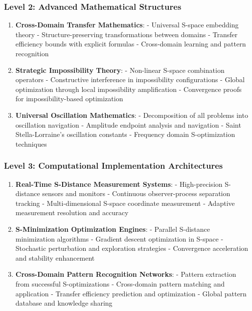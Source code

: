 \documentclass[11pt]{article}
\theoremstyle{definition}
\theoremstyle{remark}
\begin{document}
\subsubsection{Level 2: Advanced Mathematical Structures}

\begin{enumerate}
\item \textbf{Cross-Domain Transfer Mathematics}:
   - Universal S-space embedding theory
   - Structure-preserving transformations between domains
   - Transfer efficiency bounds with explicit formulas
   - Cross-domain learning and pattern recognition

\item \textbf{Strategic Impossibility Theory}:
   - Non-linear S-space combination operators
   - Constructive interference in impossibility configurations
   - Global optimization through local impossibility amplification
   - Convergence proofs for impossibility-based optimization

\item \textbf{Universal Oscillation Mathematics}:
   - Decomposition of all problems into oscillation navigation
   - Amplitude endpoint analysis and navigation
   - Saint Stella-Lorraine's oscillation constants
   - Frequency domain S-optimization techniques
\end{enumerate}

\subsubsection{Level 3: Computational Implementation Architectures}

\begin{enumerate}
\item \textbf{Real-Time S-Distance Measurement Systems}:
   - High-precision S-distance sensors and monitors
   - Continuous observer-process separation tracking
   - Multi-dimensional S-space coordinate measurement
   - Adaptive measurement resolution and accuracy

\item \textbf{S-Minimization Optimization Engines}:
   - Parallel S-distance minimization algorithms
   - Gradient descent optimization in S-space
   - Stochastic perturbation and exploration strategies
   - Convergence acceleration and stability enhancement

\item \textbf{Cross-Domain Pattern Recognition Networks}:
   - Pattern extraction from successful S-optimizations
   - Cross-domain pattern matching and application
   - Transfer efficiency prediction and optimization
   - Global pattern database and knowledge sharing
\end{enumerate}
\end{document}

